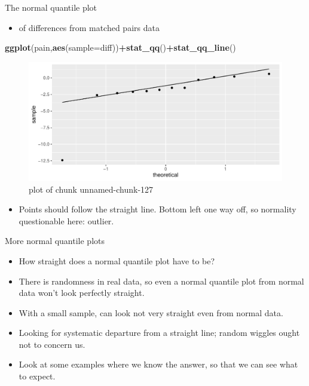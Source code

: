 \documentclass[
  ignorenonframetext,
]{beamer}
\newenvironment{Shaded}{\begin{snugshade}}{\end{snugshade}}
\newcommand{\DataTypeTok}[1]{\textcolor[rgb]{0.13,0.29,0.53}{#1}}
\newcommand{\KeywordTok}[1]{\textcolor[rgb]{0.13,0.29,0.53}{\textbf{#1}}}
\newcommand{\NormalTok}[1]{#1}
\newcommand{\OperatorTok}[1]{\textcolor[rgb]{0.81,0.36,0.00}{\textbf{#1}}}
\providecommand{\tightlist}{%
  \setlength{\itemsep}{0pt}\setlength{\parskip}{0pt}}
\begin{document}
\begin{frame}[fragile]{The normal quantile plot}
\protect\hypertarget{the-normal-quantile-plot}{}

\begin{itemize}
\tightlist
\item
  of differences from matched pairs data
\end{itemize}

\begin{Shaded}
\begin{Highlighting}[]
\KeywordTok{ggplot}\NormalTok{(pain,}\KeywordTok{aes}\NormalTok{(}\DataTypeTok{sample=}\NormalTok{diff))}\OperatorTok{+}\KeywordTok{stat_qq}\NormalTok{()}\OperatorTok{+}\KeywordTok{stat_qq_line}\NormalTok{()}
\end{Highlighting}
\end{Shaded}

\begin{figure}
\centering
\includegraphics{figure/unnamed-chunk-127-1.pdf}
\caption{plot of chunk unnamed-chunk-127}
\end{figure}

\begin{itemize}
\tightlist
\item
  Points should follow the straight line. Bottom left one way off, so
  normality questionable here: outlier.
\end{itemize}

\end{frame}

\begin{frame}{More normal quantile plots}
\protect\hypertarget{more-normal-quantile-plots}{}

\begin{itemize}
\tightlist
\item
  How straight does a normal quantile plot have to be?
\item
  There is randomness in real data, so even a normal quantile plot from
  normal data won't look perfectly straight.
\item
  With a small sample, can look not very straight even from normal data.
\item
  Looking for systematic departure from a straight line; random wiggles
  ought not to concern us.
\item
  Look at some examples where we know the answer, so that we can see
  what to expect.
\end{itemize}

\end{frame}
\end{document}
